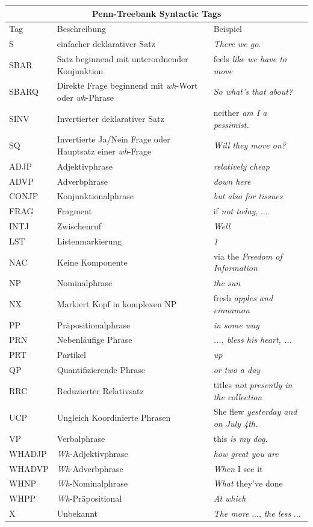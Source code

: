 \begin{table}
\begin{tabular}{ | l p{7cm} p{4cm} |}
	\hline
	\multicolumn{3}{|c|}{Penn-Treebank Syntactic Tags} \\
	\hline
	\hline
	Tag & Beschreibung & Beispiel \\
	\hline
	S & einfacher deklarativer Satz & \textit{There we go.} \\
	SBAR & Satz beginnend mit unterordnender Konjunktion & feels \textit{like we have to move} \\
	SBARQ & Direkte Frage beginnend mit \textit{wh}-Wort oder \textit{wh}-Phrase & \textit{So what's that about?} \\
	SINV & Invertierter deklarativer Satz & neither \textit{am I a pessimist.} \\
	SQ & Invertierte Ja/Nein Frage oder Hauptsatz einer \textit{wh}-Frage & \textit{Will they move on?} \\
	
	ADJP & Adjektivphrase & \textit{relatively cheap} \\
	ADVP & Adverbphrase & \textit{down here} \\
	CONJP & Konjunktionalphrase &  \textit{but also for tissues}\\
	FRAG & Fragment & if \textit{not today}, ... \\
	INTJ & Zwischenruf &  \textit{Well} \\
	LST & Listenmarkierung & \textit{1} \\
	NAC & Keine Komponente & via the \textit{Freedom of Information} \\
	NP & Nominalphrase & \textit{the sun} \\
	NX & Markiert Kopf in komplexen NP & fresh \textit{apples and cinnamon} \\
	PP & Präpositionalphrase & \textit{in some way} \\
	PRN & Nebenläufige Phrase & \textit{..., bless his heart, ...} \\
	PRT & Partikel & \textit{up} \\
	QP & Quantifizierende Phrase & \textit{or two a day} \\
	RRC & Reduzierter Relativsatz & titles \textit{not presently in the collection} \\
	UCP & Ungleich Koordinierte Phrasen & She flew \textit{yesterday and on July 4th.} \\
	VP & Verbalphrase & this \textit{is my dog.} \\
	WHADJP	& \textit{Wh}-Adjektivphrase & \textit{how great you are} \\
	WHADVP & \textit{Wh}-Adverbphrase & \textit{When} I see it\\
	WHNP & \textit{Wh}-Nominalphrase & \textit{What} they've done \\
	WHPP & \textit{Wh}-Präpositional & \textit{At which} \\
	X & Unbekannt & \textit{The more} ..., \textit{the less} ... \\	
	

\end{tabular}
\end{table}
